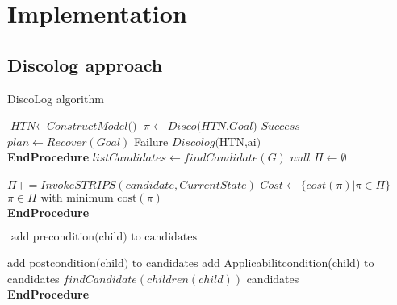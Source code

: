 \chapter{Implementation} %

\label{Chapter 4} %

\section{Discolog approach}
\begin{algorithm}
	\caption{DiscoLog algorithm}\label{euclid}
	\begin{algorithmic}[]
		\State $\textit{HTN} \gets\textit{ConstructModel()} $
		\State $\pi \gets Disco \textit{(HTN,Goal)}$
		\State \Return $\textit{Success} $
		\Else 
		\State$ plan \gets Recover(Goal)$
		\State \Return Failure
		\Else 
		\State  $\textit{Discolog} \text{(HTN,ai)}$
		\EndFor
		\EndIf
		\EndIf
		\\
		\EndProcedure \textbf{EndProcedure}
		\State 
		\State $\textit{listCandidates}\gets\textit{findCandidate}{(G)} $
		\State \Return $\textit{null} $
		\Else 
		\State $\Pi \gets \emptyset$
		
		\State $\Pi += InvokeSTRIPS(candidate,CurrentState)$
		\State  $Cost \gets \{ cost(\pi) | \pi \in  \Pi \} $
		\EndFor
		\EndIf
		\State \Return $\pi \in \Pi \text{ with minimum cost}(\pi)$
		\\
		\EndProcedure \textbf{EndProcedure}
		
		\State 
		
		\State $  \text{ add precondition(child) to candidates}$
		
		\State $\text{add postcondition(child) to candidates}$
		\EndIf
		\State add Applicabilitcondition(child) to candidates
		\EndIf
		\State $\textit{findCandidate} (children(child))$
		\EndFor
		\State \Return candidates
		\\
		\EndProcedure \textbf{EndProcedure}
		
	\end{algorithmic}
\end{algorithm}
